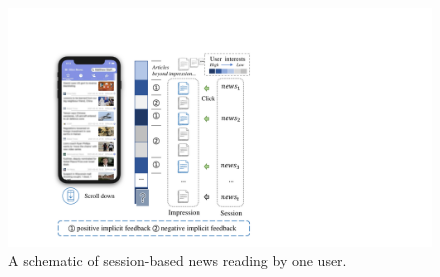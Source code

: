 

\begin{figure}[th]
    \centering
    \includegraphics[width=\columnwidth]{fig/example.pdf}
    \caption{A schematic of session-based news reading by one user. 
}
    \label{fig:session}
\end{figure}


